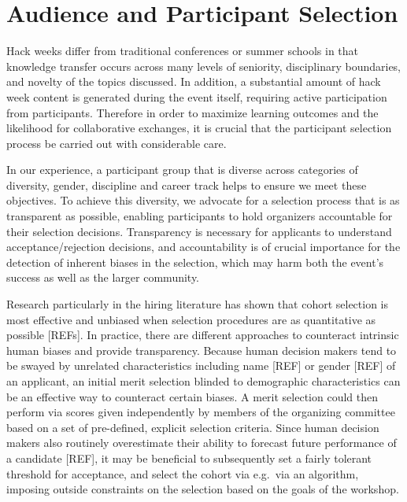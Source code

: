 \section*{Audience and Participant Selection}

Hack weeks differ from traditional conferences or summer schools in that knowledge transfer occurs across many levels of seniority, disciplinary boundaries, and novelty of the topics discussed.
In addition, a substantial amount of hack week content is generated during the event itself, requiring active participation from participants.
Therefore in order to maximize learning outcomes and the likelihood for collaborative exchanges, it is crucial that the participant selection process be carried out with considerable care.

In our experience, a participant group that is diverse across categories of diversity, gender, discipline and career track helps to ensure we meet these objectives.
To achieve this diversity, we advocate for a selection process that is as transparent as possible, enabling participants to hold organizers accountable for their selection decisions.
Transparency is necessary for applicants to understand acceptance/rejection decisions, and accountability is of crucial importance for the detection of inherent biases in the selection, which may harm both the event's success as well as the larger community.

Research particularly in the hiring literature has shown that cohort selection is most effective and unbiased when selection procedures are as quantitative as possible [REFs]. 
In practice, there are different approaches to counteract intrinsic human biases and provide transparency. 
Because human decision makers tend to be swayed by unrelated characteristics including name [REF] or gender [REF] of an applicant, an initial merit selection blinded to demographic characteristics can be an effective way to counteract certain biases. A merit selection could then perform via scores given independently by members of the organizing committee based on a set of pre-defined, explicit selection criteria. 
Since human decision makers also routinely overestimate their ability to forecast future performance of a candidate [REF], it may be beneficial to subsequently set a fairly tolerant threshold for acceptance, and select the cohort via e.g.\ via an algorithm, imposing outside constraints on the selection based on the goals of the workshop. 

